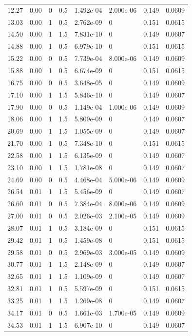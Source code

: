 \documentclass[preview]{standalone}
\begin{document}
{{\begin{tabular}{L{1.2cm}C{1.2cm} C{0.3cm}C{0.5cm} C{1.4cm}C{1.4cm} C{1.4cm}C{1.4cm}}
  12.27  &  0.00  & 0     & 0.5 &  1.492e-04  & 2.000e-06  & 0.149 &  0.0609   \\ 
  13.03  &  0.00  & 1     & 0.5 &  2.762e-09  & 0  & 0.151 &  0.0615   \\ 
  14.50  &  0.00  & 1     & 1.5 &  7.831e-10  & 0  & 0.149 &  0.0607   \\ 
  14.88  &  0.00  & 1     & 0.5 &  6.979e-10  & 0  & 0.151 &  0.0615   \\ 
  15.22  &  0.00  & 0     & 0.5 &  7.739e-04  & 8.000e-06  & 0.149 &  0.0609   \\ 
  15.88  &  0.00  & 1     & 0.5 &  6.674e-09  & 0  & 0.151 &  0.0615   \\ 
  16.75  &  0.00  & 0     & 0.5 &  3.648e-05  & 0  & 0.149 &  0.0609   \\ 
  17.10  &  0.00  & 1     & 1.5 &  5.846e-10  & 0  & 0.149 &  0.0607   \\ 
  17.90  &  0.00  & 0     & 0.5 &  1.149e-04  & 1.000e-06  & 0.149 &  0.0609   \\ 
  18.06  &  0.00  & 1     & 1.5 &  5.809e-09  & 0  & 0.149 &  0.0607   \\ 
  20.69  &  0.00  & 1     & 1.5 &  1.055e-09  & 0  & 0.149 &  0.0607   \\ 
  21.70  &  0.00  & 1     & 0.5 &  7.348e-10  & 0  & 0.151 &  0.0615   \\ 
  22.58  &  0.00  & 1     & 1.5 &  6.135e-09  & 0  & 0.149 &  0.0607   \\ 
  23.10  &  0.00  & 1     & 1.5 &  1.781e-08  & 0  & 0.149 &  0.0607   \\ 
  24.69  &  0.00  & 0     & 0.5 &  4.468e-04  & 5.000e-06  & 0.149 &  0.0609   \\ 
  26.54  &  0.01  & 1     & 1.5 &  5.456e-09  & 0  & 0.149 &  0.0607   \\ 
  26.60  &  0.01  & 0     & 0.5 &  7.384e-04  & 8.000e-06  & 0.149 &  0.0609   \\ 
  27.00  &  0.01  & 0     & 0.5 &  2.026e-03  & 2.100e-05  & 0.149 &  0.0609   \\ 
  28.07  &  0.01  & 1     & 0.5 &  3.184e-09  & 0  & 0.151 &  0.0615   \\ 
  29.42  &  0.01  & 1     & 0.5 &  1.459e-08  & 0  & 0.151 &  0.0615   \\ 
  29.58  &  0.01  & 0     & 0.5 &  2.969e-03  & 3.000e-05  & 0.149 &  0.0609   \\ 
  30.77  &  0.01  & 1     & 1.5 &  2.148e-09  & 0  & 0.149 &  0.0607   \\ 
  32.65  &  0.01  & 1     & 1.5 &  1.109e-09  & 0  & 0.149 &  0.0607   \\ 
  32.81  &  0.01  & 1     & 0.5 &  5.597e-09  & 0  & 0.151 &  0.0615   \\ 
  33.25  &  0.01  & 1     & 1.5 &  1.269e-08  & 0  & 0.149 &  0.0607   \\ 
  34.17  &  0.01  & 0     & 0.5 &  1.661e-03  & 1.700e-05  & 0.149 &  0.0609   \\ 
  34.53  &  0.01  & 1     & 1.5 &  6.907e-10  & 0  & 0.149 &  0.0607   \\ 
\hline 
\end{tabular} 

}}
\end{document}
